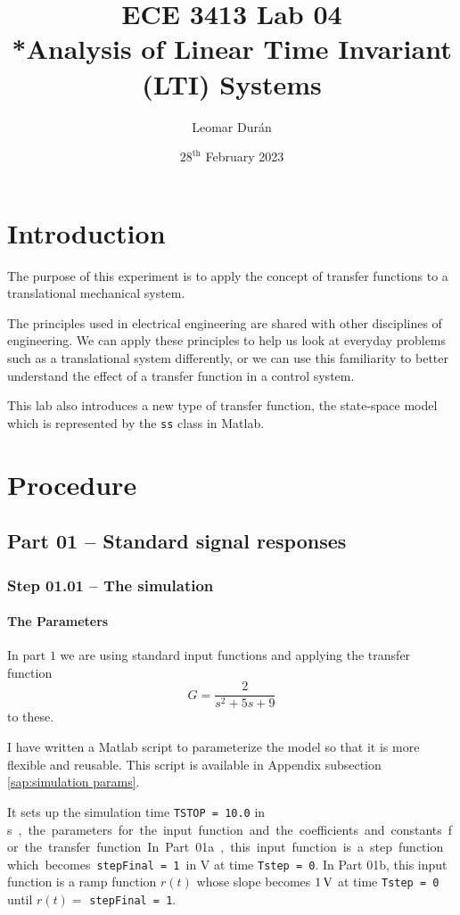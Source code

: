 \documentclass[12pt]{article}
\title{ECE 3413 Lab 04\\*Analysis of Linear Time Invariant (LTI) Systems}
\author{Leomar Dur\'an}
\date{${28}^{\text{th}}$ February 2023}
\begin{document}
\maketitle
\newpage

\section{Introduction}

The purpose of this experiment is to apply the concept of transfer functions to a translational mechanical system.

The principles used in electrical engineering are shared with other disciplines of engineering.
We can apply these principles to help us look at everyday problems such as a translational system differently,
or we can use this familiarity to better understand the effect of a transfer function in a control system.

This lab also introduces a new type of transfer function, the state-space model which is represented by the \texttt{ss} class in Matlab.

\section{Procedure}

\subsection{Part 01 -- Standard signal responses}

\subsubsection{Step 01.01 -- The simulation}

\paragraph{The Parameters}

In part $1$ we are using standard input functions and applying the transfer function
$$
    G = \frac2{s^2 + 5 s + 9}
$$
to these.

I have written a Matlab script to parameterize the model so that it is more flexible and reusable.
This script is available in Appendix subsection \ref{sap:simulation params}.

It sets up the simulation time \texttt{TSTOP = 10.0} in \si\second, the parameters for the input function and the coefficients and constants for the transfer function.
In Part 01a, this input function is a step function which becomes \texttt{stepFinal = 1} in $\si\volt$ at time \texttt{Tstep = 0}.
In Part 01b, this input function is a ramp function $r(t)$ whose slope becomes $\SI1\volt$ at time \texttt{Tstep = 0} until $r(t) =$ \texttt{stepFinal = 1}.
\end{document}
